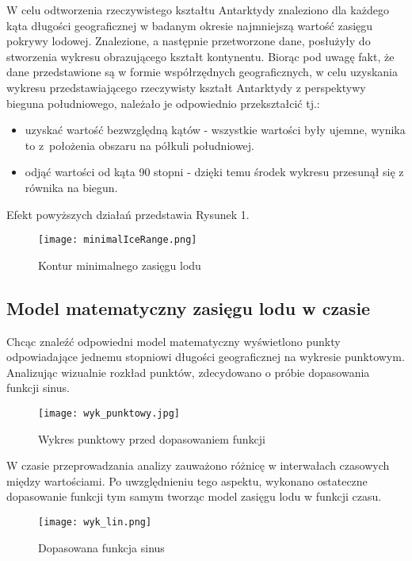 \documentclass[letterpaper,12pt]{article}
\begin{document}
W celu odtworzenia rzeczywistego kształtu Antarktydy znaleziono dla każdego kąta długości geograficznej w badanym okresie najmniejszą wartość zasięgu pokrywy lodowej. Znalezione, a następnie przetworzone dane, posłużyły do stworzenia wykresu obrazującego kształt kontynentu. \newline Biorąc pod uwagę fakt, że dane przedstawione są w formie współrzędnych geograficznych, w celu uzyskania wykresu przedstawiającego rzeczywisty kształt Antarktydy z perspektywy bieguna południowego, należało je odpowiednio przekształcić tj.:
\begin{itemize}
  \item uzyskać wartość bezwzględną kątów - wszystkie wartości były ujemne, wynika to z~położenia obszaru na półkuli południowej.
  \item odjąć wartości od kąta 90 stopni - dzięki temu środek wykresu przesunął się z równika na biegun.
\end{itemize}

Efekt powyższych działań przedstawia Rysunek 1.

\begin{figure}[ht]
        \centering \texttt{[image: minimalIceRange.png]}
        \caption{
                \label{fig:samplesetup} 
                Kontur minimalnego zasięgu lodu
        }
\end{figure}

\subsection{Model matematyczny zasięgu lodu w czasie}
Chcąc znaleźć odpowiedni model matematyczny wyświetlono punkty odpowiadające jednemu stopniowi długości geograficznej na wykresie punktowym. Analizując wizualnie rozkład punktów, zdecydowano o próbie dopasowania funkcji sinus.
\newpage
\begin{figure}[ht]
        \centering \texttt{[image: wyk\_punktowy.jpg]}
        \caption{
                \label{fig:samplesetup} 
                Wykres punktowy przed dopasowaniem funkcji
        }
\end{figure}


\noindent W czasie przeprowadzania analizy zauważono różnicę w interwałach czasowych między wartościami. Po uwzględnieniu tego aspektu, wykonano ostateczne dopasowanie funkcji tym samym tworząc model zasięgu lodu w funkcji czasu.
\newline
\begin{figure}[H]
        \centering \texttt{[image: wyk\_lin.png]}
        \caption{
                \label{fig:samplesetup} 
                Dopasowana funkcja sinus
        }
\end{figure}
\end{document}
